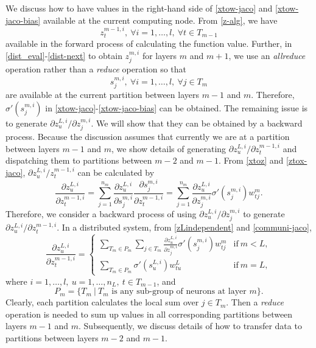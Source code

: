 \documentclass[12pt]{article}
\begin{document}
\par We discuss how to have values in the right-hand side of \eqref{xtow-jaco} and \eqref{xtow-jaco-bias} available at the current computing node. 
From \eqref{z-alg}, we have
\begin{equation*} 
z^{m-1,i}_t,\ \forall i=1,\ldots,l,\ \forall t \in T_{m-1}
\end{equation*}
available in the forward process of calculating the function value. Further, in \eqref{dist_eval}-\eqref{dist-next} to obtain $z^{m,i}_j$
for layers $m$ and $m+1$, we use an {\it allreduce} operation rather than a {\it reduce} operation so that 
\begin{equation*}
s^{m,i}_j,\ \forall i = 1,\ldots,l,\ \forall j \in T_m
\end{equation*}
are available at the current partition between layers $m-1$ and $m$. Therefore, $\sigma'(s^{m,i}_j)$ in \eqref{xtow-jaco}-\eqref{xtow-jaco-bias}
can be obtained. The remaining issue is to generate $\partial z^{L,i}_u/\partial z^{m,i}_j$.
We will show that they can be obtained by a backward process.
Because the discussion assumes that currently we are at a partition between layers $m-1$ and $m$, we show details of generating $\partial z^{L,i}_u/\partial z^{m-1,i}_t$
and dispatching them to partitions between $m-2$ and $m-1$. 
From \eqref{xtoz} and \eqref{ztox-jaco}, $\partial z^{L,i}_u/z^{m-1,i}_t$ can be calculated by
\begin{equation}
\frac{\partial z^{L,i}_u}{\partial z^{m-1,i}_t} = \sum_{j=1}^{n_m} \frac{\partial z^{L,i}_u}{\partial s^{m,i}_j} \frac{\partial s^{m,i}_j}{\partial z^{m-1,i}_t} 
= \sum_{j=1}^{n_m} \frac{\partial z^{L,i}_u}{\partial z^{m,i}_j} \sigma'(s^{m,i}_j) w^m_{tj}.
\label{communi-jaco}
\end{equation}
Therefore, we consider a backward process of using $\partial z^{L,i}_u/\partial z^{m,i}_j$ to generate $\partial z^{L,i}_u/\partial z^{m-1,i}_t$.
In a distributed system, from \eqref{zLindependent} and \eqref{communi-jaco},
\begin{equation}
\frac{\partial z^{L,i}_u}{\partial z^{m-1,i}_t} =
\begin{cases}
\sum_{T_m \in P_m} \sum_{j \in T_m} \frac{\partial z^{L,i}_u}{\partial z^{m,i}_j} \sigma'(s^{m,i}_j) w^m_{tj} &\text{if}\ m < L,\\
\sum_{T_m \in P_m} \sigma'(s^{L,i}_u) w^L_{tu}&\text{if}\ m=L,
\end{cases}
\label{jaco-sum}
\end{equation}
where $i=1,\ldots,l,\ u=1,\ldots,n_L,\ t \in T_{m-1}$, and
\begin{equation}
\label{pmdefine}
	P_m = \{ T_m \ |\  T_m \text{ is any sub-group of neurons at layer $m$}\}.
\end{equation}
Clearly, each partition calculates the local sum over $j \in T_m$. Then a {\it reduce} operation is needed to sum up values in all corresponding partitions between layers $m-1$ and $m$.
Subsequently, we discuss details of how to transfer data to partitions between layers $m-2$ and $m-1$.
\end{document}

